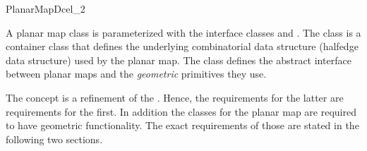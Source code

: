 
\ccRefPageBegin


\begin{ccRefConcept}{PlanarMapDcel_2}

A planar map class is parameterized with the interface classes 
 and  . The  class is
a container class that defines the 
underlying combinatorial data structure (halfedge data structure) 
used by the planar map. 
The  class defines the abstract interface
between planar maps and the {\em geometric} primitives they use. 

The
\lcTex{\ccc{\ccRefName}}\lcHtml{\ccRefName}
concept is a refinement of the . Hence, the requirements for the latter are requirements for the first. 
In addition 
the 
classes for the planar map are
required to have geometric functionality. 
The exact requirements of those are stated in the following two sections.
\end{ccRefConcept} %

\ccRefPageEnd
